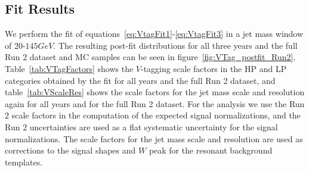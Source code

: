 \subsection{Fit Results}

We perform the fit of equations~\ref{eq:VtagFit1}-\ref{eq:VtagFit3} in a jet mass window of 20-$145\unit{GeV}$.
The resulting post-fit distributions for all three years and the full Run 2 dataset and MC samples can be seen in figure~\ref{fig:VTag_postfit_Run2}.
Table~\ref{tab:VTagFactors} shows the $V$-tagging scale factors in the HP and LP categories obtained by the fit for all years and the full Run 2 dataset, and table~\ref{tab:VScaleRes} shows the scale factors for the jet mass scale and resolution again for all years and for the full Run 2 dataset.
For the analysis we use the Run 2 scale factors in the computation of the expected signal normalizations, and the Run 2 uncertainties are used as a flat systematic uncertainty for the signal normalizations.
The scale factors for the jet mass scale and resolution are used as corrections to the signal shapes and $W$ peak for the resonant background templates.

